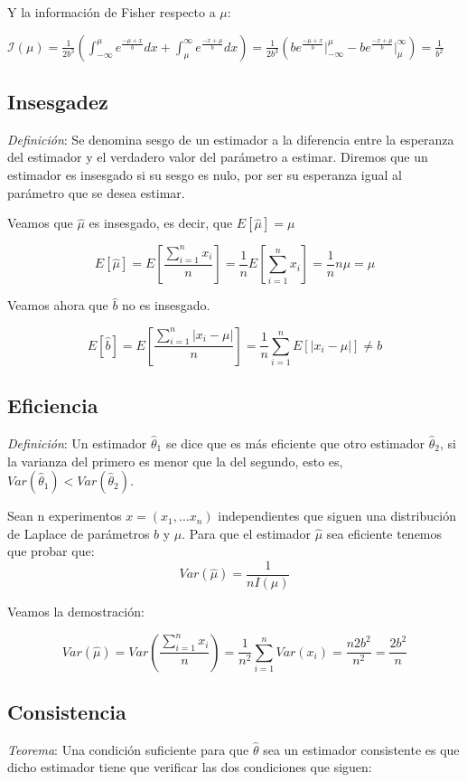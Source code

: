 \documentclass[a4paper, 10pt]{article} %
\begin{document}
Y la información de Fisher respecto a $\mu$:

$ \displaystyle \mathcal{I}(\mu) = \frac{1}{2b^3} \left(\int^\mu_{-\infty} e^{\frac{-\mu+x}{b}} dx +
\int^\infty_{\mu} e^{\frac{-x+\mu}{b}} dx \right) =  \frac{1}{2b^3} \left( b e^{\frac{-\mu+x}{b}} \Big|^\mu_{-\infty} -
b e^{\frac{-x+\mu}{b}} \Big|^\infty_{\mu}\right) = \frac{1}{b^2}$

\subsection{Insesgadez}
\emph{Definición}: Se denomina sesgo de un estimador a la diferencia entre la esperanza del estimador
y el verdadero valor del parámetro a estimar. Diremos que un estimador es insesgado si su sesgo es nulo, por ser
su esperanza igual al parámetro que se desea estimar.

Veamos que $\hat{\mu}$ es insesgado, es decir, que  $E\left[\hat{\mu}\right]=\mu$

$$E\left[\hat{\mu}\right] = E\left[\frac{\sum_{i=1}^{n}x_i}{n}\right] = \frac{1}{n}E\left[\sum_{i=1}^{n}x_i\right] = \frac{1}{n}n\mu = \mu $$

Veamos ahora que $\hat{b}$ no es insesgado. 

$$E\left[\hat{b}\right] = E\left[\frac{\sum_{i=1}^{n}|x_i - \mu|}{n}\right] = \frac{1}{n}\sum_{i=1}^{n}E\left[|x_i - \mu|\right] \neq b$$ 

\subsection{Eficiencia}
\emph{Definición}: Un estimador $\hat{\theta}_1$ se dice que es más eficiente que otro estimador
$\hat{\theta}_2$, si la varianza del primero es menor que la del segundo, esto es,  $Var(\hat{\theta}_1)<Var(\hat{\theta}_2)$.

Sean n experimentos $x=(x_1,...x_n)$ independientes que siguen una distribución de Laplace de parámetros $b$ y $\mu$. Para que el
estimador $\hat{\mu}$ sea eficiente tenemos que probar que:
$$Var(\hat{\mu})=\frac{1}{nI(\mu)}$$

Veamos la demostración: 

$$Var(\hat{\mu}) = Var\left(\frac{\sum_{i=1}^{n}x_i}{n}\right) = \frac{1}{n^2}\sum_{i=1}^{n}Var(x_i) = \frac{n 2 b^2}{n^2} =
\frac{2 b^2}{n}$$

\subsection{Consistencia}
\emph{Teorema}: Una condición suficiente para que $\hat{\theta}$ sea un estimador consistente es que
dicho estimador tiene que verificar las dos condiciones que siguen:
\end{document}
